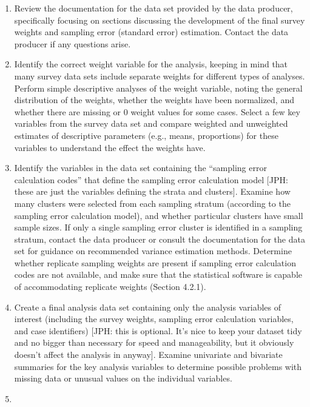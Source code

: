 \documentclass[
]{book}
\begin{document}
\begin{enumerate}
\def\labelenumi{\arabic{enumi}.}
\item
  Review the documentation for the data set provided by the data producer, specifically focusing on sections discussing the development of the final survey weights and sampling error (standard error) estimation. Contact the data producer if any questions arise.
\item
  Identify the correct weight variable for the analysis, keeping in mind that many survey data sets include separate weights for different types of analyses. Perform simple descriptive analyses of the weight variable, noting the general distribution of the weights, whether the weights have been normalized, and whether there are missing or 0 weight values for some cases. Select a few key variables from the survey data set and compare weighted and unweighted estimates of descriptive parameters (e.g., means, proportions) for these variables to understand the effect the weights have.
\item
  Identify the variables in the data set containing the ``sampling error calculation codes'' that define the sampling error calculation model {[}JPH: these are just the variables defining the strata and clusters{]}. Examine how many clusters were selected from each sampling stratum (according to the sampling error calculation model), and whether particular clusters have small sample sizes. If only a single sampling error cluster is identified in a sampling stratum, contact the data producer or consult the documentation for the data set for guidance on recommended variance estimation methods. Determine whether replicate sampling weights are present if sampling error calculation codes are not available, and make sure that the statistical software is capable of accommodating replicate weights (Section 4.2.1).
\item
  Create a final analysis data set containing only the analysis variables of interest (including the survey weights, sampling error calculation variables, and case identifiers) {[}JPH: this is optional. It's nice to keep your dataset tidy and no bigger than necessary for speed and manageability, but it obviously doesn't affect the analysis in anyway{]}. Examine univariate and bivariate summaries for the key analysis variables to determine possible problems with missing data or unusual values on the individual variables.
\item

\end{enumerate}
\end{document}
